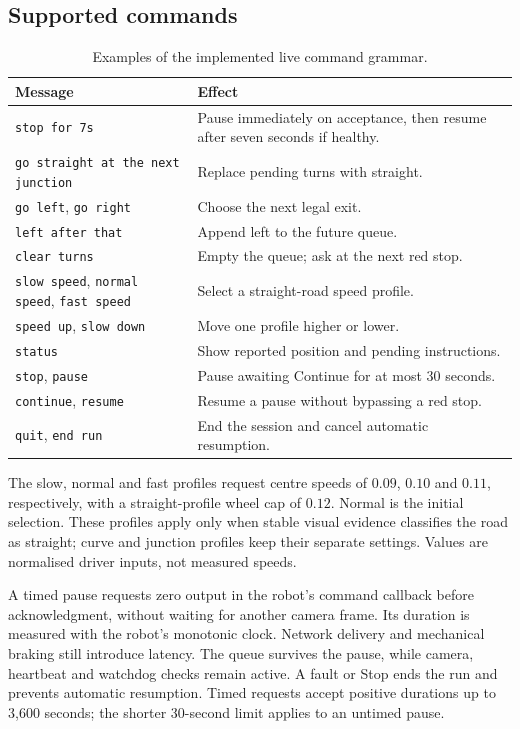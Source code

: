 \documentclass[10pt,a4paper,twocolumn]{article}
\newcommand{\code}[1]{\texttt{#1}}
\begin{document}
\subsection{Supported commands}

\begin{table}[h]
\centering
\caption{Examples of the implemented live command grammar.}
\label{tab:chat}
\footnotesize
\begin{tabularx}{\columnwidth}{@{}p{}X@{}}
\toprule
Message & Effect \\
\midrule
\code{stop for 7s} & Pause immediately on acceptance, then resume after seven seconds if healthy. \\
\code{go straight at the next junction} & Replace pending turns with straight. \\
\code{go left}, \code{go right} & Choose the next legal exit. \\
\code{left after that} & Append left to the future queue. \\
\code{clear turns} & Empty the queue; ask at the next red stop. \\
\code{slow speed}, \code{normal speed}, \code{fast speed} & Select a straight-road speed profile. \\
\code{speed up}, \code{slow down} & Move one profile higher or lower. \\
\code{status} & Show reported position and pending instructions. \\
\code{stop}, \code{pause} & Pause awaiting Continue for at most 30 seconds. \\
\code{continue}, \code{resume} & Resume a pause without bypassing a red stop. \\
\code{quit}, \code{end run} & End the session and cancel automatic resumption. \\
\bottomrule
\end{tabularx}
\end{table}

The slow, normal and fast profiles request centre speeds of $0.09$, $0.10$ and
$0.11$, respectively, with a straight-profile wheel cap of $0.12$. Normal is
the initial selection. These profiles apply only when stable visual evidence
classifies the road as straight; curve and junction profiles keep their
separate settings. Values are normalised driver inputs, not measured speeds.

A timed pause requests zero output in the robot's command callback before
acknowledgment, without waiting for another camera frame. Its duration is
measured with the robot's monotonic clock. Network delivery and mechanical
braking still introduce latency. The queue survives the pause, while camera,
heartbeat and watchdog checks remain active. A fault or Stop ends the run and
prevents automatic resumption. Timed requests accept positive durations up to
3,600 seconds; the shorter 30-second limit applies to an untimed pause.
\end{document}
